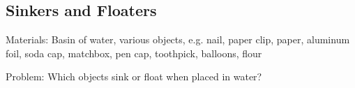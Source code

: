 \pagebreak


\subsection{Sinkers and Floaters}


\begin{description*}
\item[Materials:]{Basin of water, various objects, e.g. nail, paper clip, paper, aluminum foil, soda cap, matchbox, pen cap, toothpick, balloons, flour}
\item[Problem:]{Which objects sink or float when placed in water?\\

}
\end{description*}
